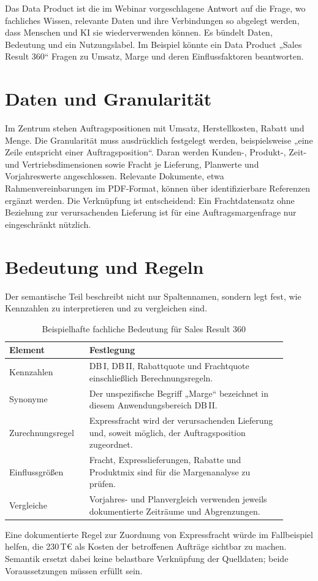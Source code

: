 \documentclass[a4paper,12pt,twoside]{report}
\theoremstyle{definition}
\begin{document}
Das Data Product ist die im Webinar vorgeschlagene Antwort auf die Frage, wo fachliches Wissen, relevante Daten und ihre Verbindungen so abgelegt werden, dass Menschen und KI sie wiederverwenden können. Es bündelt Daten, Bedeutung und ein Nutzungslabel. Im Beispiel könnte ein Data Product „Sales Result 360“ Fragen zu Umsatz, Marge und deren Einflussfaktoren beantworten.

\section{Daten und Granularität}
Im Zentrum stehen Auftragspositionen mit Umsatz, Herstellkosten, Rabatt und Menge. Die Granularität muss ausdrücklich festgelegt werden, beispielsweise „eine Zeile entspricht einer Auftragsposition“. Daran werden Kunden-, Produkt-, Zeit- und Vertriebsdimensionen sowie Fracht je Lieferung, Planwerte und Vorjahreswerte angeschlossen. Relevante Dokumente, etwa Rahmenvereinbarungen im PDF-Format, können über identifizierbare Referenzen ergänzt werden. Die Verknüpfung ist entscheidend: Ein Frachtdatensatz ohne Beziehung zur verursachenden Lieferung ist für eine Auftragsmargenfrage nur eingeschränkt nützlich.

\section{Bedeutung und Regeln}
Der semantische Teil beschreibt nicht nur Spaltennamen, sondern legt fest, wie Kennzahlen zu interpretieren und zu vergleichen sind.
\begin{table}[htbp]
\centering
\small
\caption{Beispielhafte fachliche Bedeutung für Sales Result 360}
\label{tab:meaning}
\begin{tabular}{p{0.25\linewidth}p{0.65\linewidth}}
\toprule
\textbf{Element} & \textbf{Festlegung} \\
\midrule
Kennzahlen & DB\,I, DB\,II, Rabattquote und Frachtquote einschließlich Berechnungsregeln. \\
Synonyme & Der unspezifische Begriff „Marge“ bezeichnet in diesem Anwendungsbereich DB\,II. \\
Zurechnungsregel & Expressfracht wird der verursachenden Lieferung und, soweit möglich, der Auftragsposition zugeordnet. \\
Einflussgrößen & Fracht, Expresslieferungen, Rabatte und Produktmix sind für die Margenanalyse zu prüfen. \\
Vergleiche & Vorjahres- und Planvergleich verwenden jeweils dokumentierte Zeiträume und Abgrenzungen. \\
\bottomrule
\end{tabular}
\end{table}
Eine dokumentierte Regel zur Zuordnung von Expressfracht würde im Fallbeispiel helfen, die 230\,T€ als Kosten der betroffenen Aufträge sichtbar zu machen. Semantik ersetzt dabei keine belastbare Verknüpfung der Quelldaten; beide Voraussetzungen müssen erfüllt sein.
\end{document}
